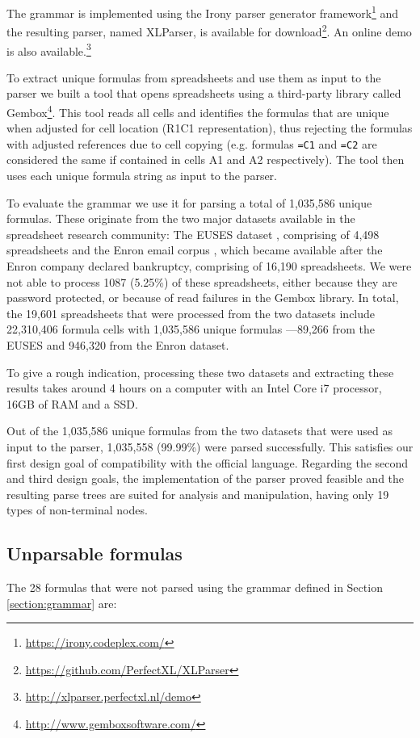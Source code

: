 \documentclass[conference]{IEEEtran}
\begin{document}
The grammar is implemented using the Irony parser generator framework\footnote{\url{https://irony.codeplex.com/}} and the resulting parser, named XLParser, is available for download\footnote{\url{https://github.com/PerfectXL/XLParser}}. An online demo is also available.\footnote{\url{http://xlparser.perfectxl.nl/demo}}

To extract unique formulas from spreadsheets and use them as input to the parser we built a tool that opens spreadsheets using a third-party library called Gembox\footnote{\url{http://www.gemboxsoftware.com/}}. This tool reads all cells and identifies the formulas that are unique when adjusted for cell location (R1C1 representation), thus rejecting the formulas with adjusted references due to cell copying (e.g. formulas \texttt{=C1} and \texttt{=C2} are considered the same if contained in cells A1 and A2 respectively). The tool then uses each unique formula string as input to the parser.

To evaluate the grammar we use it for parsing a total of 1,035,586 unique formulas. These originate from the two major datasets available in the spreadsheet research community: The EUSES dataset \cite{euses}, comprising of 4,498 spreadsheets and the Enron email corpus \cite{enron}, which became available after the Enron company declared bankruptcy, comprising of 16,190 spreadsheets. We were not able to process 1087 (5.25\%) of these spreadsheets, either because they are password protected, or because of read failures in the Gembox library. In total, the 19,601 spreadsheets that were processed from the two datasets include 22,310,406 formula cells with 1,035,586 unique formulas ---89,266 from the EUSES and 946,320 from the Enron dataset.

To give a rough indication, processing these two datasets and extracting these results takes around 4 hours on a computer with an Intel Core i7 processor, 16GB of RAM and a SSD.

Out of the 1,035,586 unique formulas from the two datasets that were used as input to the parser, 1,035,558 (99.99\%) were parsed successfully. This satisfies our first design goal of compatibility with the official language. Regarding the second and third design goals, the implementation of the parser proved feasible and the resulting parse trees are suited for analysis and manipulation, having only 19 types of non-terminal nodes.

\subsection{Unparsable formulas}
\label{subsection:unparsableFormulas}
The 28 formulas that were not parsed using the grammar defined in Section \ref{section:grammar} are:
\end{document}
